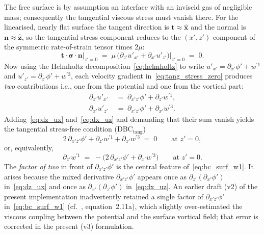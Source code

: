 \documentclass{article}
\begin{document}
The free surface is by assumption an interface with an inviscid gas of negligible mass; consequently the tangential viscous stress must vanish there.
For the linearised, nearly flat surface the tangent direction is $\bm{t} \approx \hat{\bm{x}}$ and the normal is $\bm{n} \approx \hat{\bm{z}}$, so the tangential stress component reduces to the $(x', z')$ component of the symmetric rate-of-strain tensor times $2\mu$:
\begin{equation}
    \bm{t}\cdot\bm{\sigma}\cdot\bm{n}\big|_{z'=0} \;=\; \mu\,\big(\partial_{z'}u'_{x'} + \partial_{x'}u'_{z'}\big)\big|_{z'=0} \;=\; 0. \label{eq:tang_stress_zero}
\end{equation}
Now using the Helmholtz decomposition~\eqref{eq:helmholtz} to write $u'_{x'} = \partial_{x'}\phi' + w^{\prime 1}$ and $u'_{z'} = \partial_{z'}\phi' + w^{\prime 3}$, each velocity gradient in~\eqref{eq:tang_stress_zero} produces \emph{two} contributions i.e., one from the potential and one from the vortical part:
\begin{align}
    \partial_{z'}u'_{x'} \;&=\; \partial_{x'z'}\phi' + \partial_{z'} w^{\prime 1}, \label{eq:dz_ux} \\
    \partial_{x'}u'_{z'} \;&=\; \partial_{x'z'}\phi' + \partial_{x'} w^{\prime 3}. \label{eq:dx_uz}
\end{align}
Adding~\eqref{eq:dz_ux} and~\eqref{eq:dx_uz} and demanding that their sum vanish yields the tangential stress-free condition (DBC$_{\mathrm{tang}}$)
\begin{equation}
    2\,\partial_{x'z'}\phi' + \partial_{z'} w^{\prime 1} + \partial_{x'} w^{\prime 3} \;=\; 0 \qquad \text{at } z' = 0, \label{eq:bc_surf_w1}
\end{equation}
or, equivalently,
\begin{equation}
    \partial_{z'} w^{\prime 1} \;=\; -\big(2\,\partial_{x'z'}\phi' + \partial_{x'} w^{\prime 3}\big) \qquad \text{at } z' = 0. \label{eq:bc_surf_w1_explicit}
\end{equation}
The \emph{factor of two} in front of $\partial_{x'z'}\phi'$ is the central feature of~\eqref{eq:bc_surf_w1}.
It arises because the mixed derivative $\partial_{x'z'}\phi'$ appears once as $\partial_{z'}(\partial_{x'}\phi')$ in~\eqref{eq:dz_ux} and once as $\partial_{x'}(\partial_{z'}\phi')$ in~\eqref{eq:dx_uz}.
An earlier draft (v2) of the present implementation inadvertently retained a single factor of $\partial_{x'z'}\phi'$ in~\eqref{eq:bc_surf_w1} (cf.\ \citealt{GaleanoRiosEtAl2017}, equation~2.11a), which slightly over-estimated the viscous coupling between the potential and the surface vortical field; that error is corrected in the present (v3) formulation.
\end{document}

